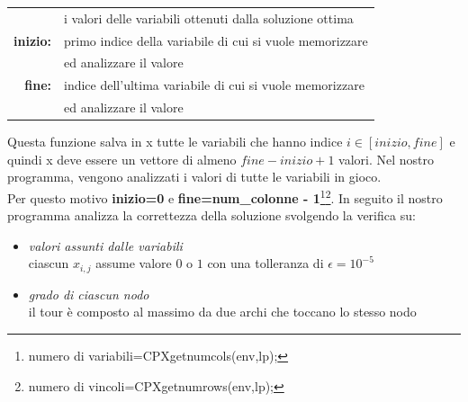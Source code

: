 \begin{itemize}
{\begin{table}[h]
\begin{tabular}{rl}
\end{tabular}
\end{table}
\begin{table}[h]
\centering
\begin{tabular}{rl}
& {i valori delle variabili ottenuti dalla soluzione ottima}\\
\textbf{inizio:} & {primo indice della variabile di cui si vuole memorizzare}\\
& {ed analizzare il valore}\\
\textbf{fine:} & {indice dell'ultima variabile di cui si vuole memorizzare}\\
& {ed analizzare il valore}\\
\end{tabular}
\end{table}
Questa funzione salva in x tutte le variabili che hanno indice $i\in [inizio, fine]$ e quindi x deve essere un vettore di almeno $fine-inizio+1$ valori. Nel nostro programma, vengono analizzati i valori di tutte le variabili in gioco.\\
Per questo motivo \textbf{inizio=0} e \textbf{fine=num\_colonne - 1}\footnote{numero di variabili=CPXgetnumcols(env,lp);}\footnote{numero di vincoli=CPXgetnumrows(env,lp);}. In seguito il nostro programma analizza la correttezza della soluzione svolgendo la verifica su:
\begin{itemize}
\item{\textit{valori assunti dalle variabili}\\
ciascun $x_{i,j}$ assume valore $0$ o $1$ con una tolleranza di $\epsilon=10^{-5}$}
\item{\textit{grado di ciascun nodo}\\
il tour è composto al massimo da due archi che toccano lo stesso nodo}
\end{itemize}
}
\end{itemize}
